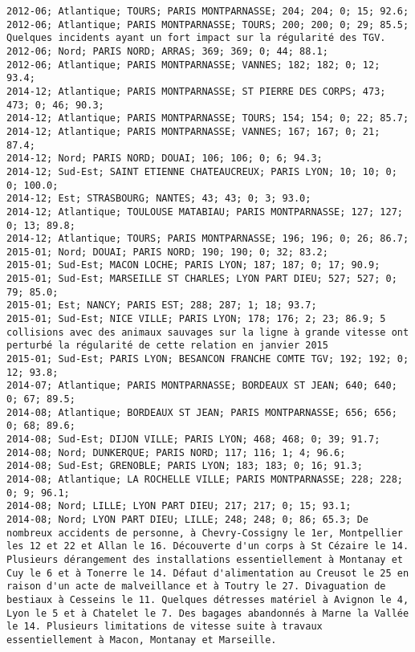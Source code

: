 \documentclass{article}
\begin{document}
\begin{Verbatim}[commandchars=\\\{\}]
2012-06; Atlantique; TOURS; PARIS MONTPARNASSE; 204; 204; 0; 15; 92.6; 
2012-06; Atlantique; PARIS MONTPARNASSE; TOURS; 200; 200; 0; 29; 85.5; Quelques incidents ayant un fort impact sur la régularité des TGV.
2012-06; Nord; PARIS NORD; ARRAS; 369; 369; 0; 44; 88.1; 
2012-06; Atlantique; PARIS MONTPARNASSE; VANNES; 182; 182; 0; 12; 93.4; 
2014-12; Atlantique; PARIS MONTPARNASSE; ST PIERRE DES CORPS; 473; 473; 0; 46; 90.3; 
2014-12; Atlantique; PARIS MONTPARNASSE; TOURS; 154; 154; 0; 22; 85.7; 
2014-12; Atlantique; PARIS MONTPARNASSE; VANNES; 167; 167; 0; 21; 87.4; 
2014-12; Nord; PARIS NORD; DOUAI; 106; 106; 0; 6; 94.3; 
2014-12; Sud-Est; SAINT ETIENNE CHATEAUCREUX; PARIS LYON; 10; 10; 0; 0; 100.0; 
2014-12; Est; STRASBOURG; NANTES; 43; 43; 0; 3; 93.0; 
2014-12; Atlantique; TOULOUSE MATABIAU; PARIS MONTPARNASSE; 127; 127; 0; 13; 89.8; 
2014-12; Atlantique; TOURS; PARIS MONTPARNASSE; 196; 196; 0; 26; 86.7; 
2015-01; Nord; DOUAI; PARIS NORD; 190; 190; 0; 32; 83.2; 
2015-01; Sud-Est; MACON LOCHE; PARIS LYON; 187; 187; 0; 17; 90.9; 
2015-01; Sud-Est; MARSEILLE ST CHARLES; LYON PART DIEU; 527; 527; 0; 79; 85.0; 
2015-01; Est; NANCY; PARIS EST; 288; 287; 1; 18; 93.7; 
2015-01; Sud-Est; NICE VILLE; PARIS LYON; 178; 176; 2; 23; 86.9; 5 collisions avec des animaux sauvages sur la ligne à grande vitesse ont perturbé la régularité de cette relation en janvier 2015
2015-01; Sud-Est; PARIS LYON; BESANCON FRANCHE COMTE TGV; 192; 192; 0; 12; 93.8; 
2014-07; Atlantique; PARIS MONTPARNASSE; BORDEAUX ST JEAN; 640; 640; 0; 67; 89.5; 
2014-08; Atlantique; BORDEAUX ST JEAN; PARIS MONTPARNASSE; 656; 656; 0; 68; 89.6; 
2014-08; Sud-Est; DIJON VILLE; PARIS LYON; 468; 468; 0; 39; 91.7; 
2014-08; Nord; DUNKERQUE; PARIS NORD; 117; 116; 1; 4; 96.6; 
2014-08; Sud-Est; GRENOBLE; PARIS LYON; 183; 183; 0; 16; 91.3; 
2014-08; Atlantique; LA ROCHELLE VILLE; PARIS MONTPARNASSE; 228; 228; 0; 9; 96.1; 
2014-08; Nord; LILLE; LYON PART DIEU; 217; 217; 0; 15; 93.1; 
2014-08; Nord; LYON PART DIEU; LILLE; 248; 248; 0; 86; 65.3; De nombreux accidents de personne, à Chevry-Cossigny le 1er, Montpellier les 12 et 22 et Allan le 16. Découverte d'un corps à St Cézaire le 14. Plusieurs dérangement des installations essentiellement à Montanay et Cuy le 6 et à Tonerre le 14. Défaut d'alimentation au Creusot le 25 en raison d'un acte de malveillance et à Toutry le 27. Divaguation de bestiaux à Cesseins le 11. Quelques détresses matériel à Avignon le 4, Lyon le 5 et à Chatelet le 7. Des bagages abandonnés à Marne la Vallée le 14. Plusieurs limitations de vitesse suite à travaux essentiellement à Macon, Montanay et Marseille.

\end{Verbatim}
\end{document}

